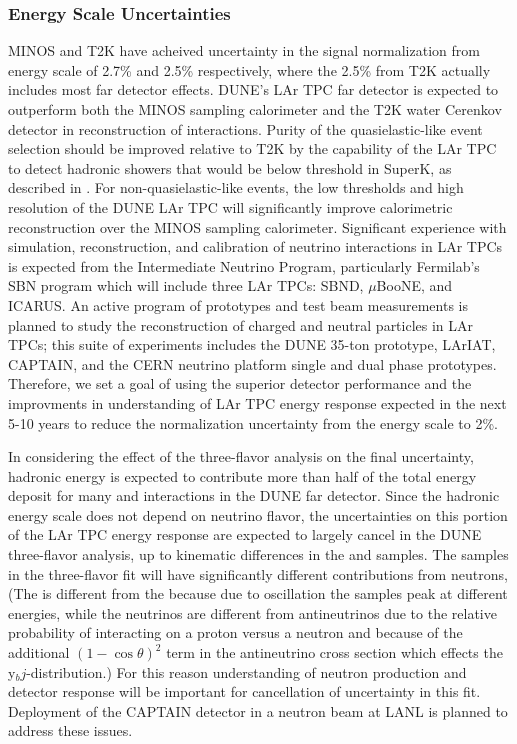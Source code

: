 \subsubsection{\nue Energy Scale Uncertainties}
\label{sec:syst_just_fd}
MINOS and T2K have acheived uncertainty in the \nue signal normalization from \nue energy scale
of 2.7\% and 2.5\% respectively,
where the 2.5\% from T2K actually includes most far detector effects. DUNE's LAr TPC far detector
is expected to outperform both the MINOS sampling calorimeter and the T2K water Cerenkov detector
in reconstruction of \nue interactions. Purity of the quasielastic-like event selection
should be improved relative to T2K by the capability of the LAr TPC to detect hadronic showers
that would be below threshold in SuperK, as described in \cite{Mosel-Lalakulich-Gallmeister:2014}. For non-quasielastic-like
events, the low thresholds and high resolution of the DUNE LAr TPC will significantly improve
calorimetric reconstruction over the MINOS sampling calorimeter.
Significant experience with simulation, reconstruction, and calibration
of neutrino interactions in LAr TPCs is expected from the Intermediate Neutrino Program, particularly
Fermilab's SBN program which will include three LAr TPCs: SBND, $\mu$BooNE, and ICARUS. An active program of
prototypes and test beam measurements is planned to study the reconstruction of charged and neutral particles
in LAr TPCs; this suite of experiments includes the DUNE 35-ton prototype, LArIAT, CAPTAIN, and
the CERN neutrino platform single and dual phase prototypes.
Therefore, we set a goal of using the superior detector performance and the improvments
in understanding of LAr TPC energy response expected in the next 5-10 years to reduce the normalization uncertainty
from the \nue energy scale to 2\%.

In considering the effect of the three-flavor analysis on the final uncertainty, hadronic energy is expected
to contribute more than half of the total energy deposit for many \nue and \numu interactions in the DUNE
far detector. Since the hadronic energy scale does not depend on neutrino flavor, the uncertainties on this
portion of the LAr TPC energy response are expected to largely cancel in the DUNE three-flavor analysis, up
to kinematic differences in the \nue and \numu samples. The samples in the three-flavor fit will have significantly different contributions from neutrons, 
(The \nue is different from the \numu because due to oscillation the samples peak at different energies, 
while the neutrinos are different from antineutrinos due to the relative probability of interacting on
a proton versus a neutron and because of the additional $(1-\cos\theta)^2$ term in the antineutrino cross section
which effects the y$_bj$-distribution.) For this reason understanding
of neutron production and detector response will be important for cancellation of uncertainty in this fit.
Deployment of the CAPTAIN detector in a neutron beam at LANL is planned to address these issues.


